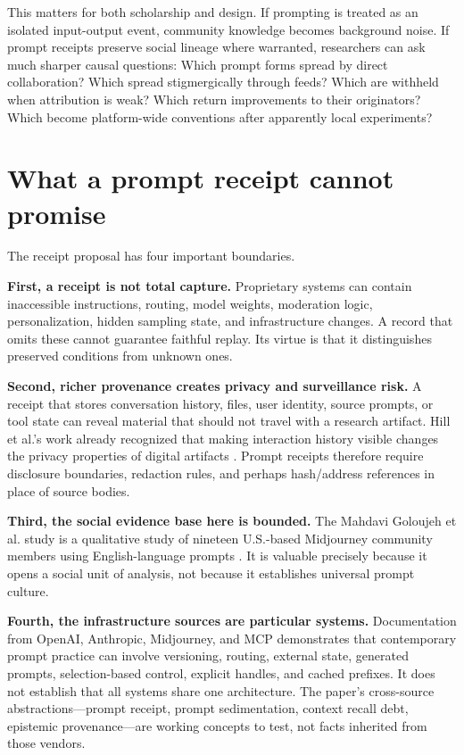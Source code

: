 \documentclass[11pt]{article}
\begin{document}
This matters for both scholarship and design. If prompting is treated as an isolated input-output event, community knowledge becomes background noise. If prompt receipts preserve social lineage where warranted, researchers can ask much sharper causal questions: Which prompt forms spread by direct collaboration? Which spread stigmergically through feeds? Which are withheld when attribution is weak? Which return improvements to their originators? Which become platform-wide conventions after apparently local experiments?

\section{What a prompt receipt cannot promise}

The receipt proposal has four important boundaries.

\textbf{First, a receipt is not total capture.} Proprietary systems can contain inaccessible instructions, routing, model weights, moderation logic, personalization, hidden sampling state, and infrastructure changes. A record that omits these cannot guarantee faithful replay. Its virtue is that it distinguishes preserved conditions from unknown ones.

\textbf{Second, richer provenance creates privacy and surveillance risk.} A receipt that stores conversation history, files, user identity, source prompts, or tool state can reveal material that should not travel with a research artifact. Hill et al.'s work already recognized that making interaction history visible changes the privacy properties of digital artifacts \cite{hill1992editwear}. Prompt receipts therefore require disclosure boundaries, redaction rules, and perhaps hash/address references in place of source bodies.

\textbf{Third, the social evidence base here is bounded.} The Mahdavi Goloujeh et al. study is a qualitative study of nineteen U.S.-based Midjourney community members using English-language prompts \cite{mahdavigoloujeh2024social}. It is valuable precisely because it opens a social unit of analysis, not because it establishes universal prompt culture.

\textbf{Fourth, the infrastructure sources are particular systems.} Documentation from OpenAI, Anthropic, Midjourney, and MCP demonstrates that contemporary prompt practice can involve versioning, routing, external state, generated prompts, selection-based control, explicit handles, and cached prefixes. It does not establish that all systems share one architecture. The paper's cross-source abstractions---prompt receipt, prompt sedimentation, context recall debt, epistemic provenance---are working concepts to test, not facts inherited from those vendors.
\end{document}
